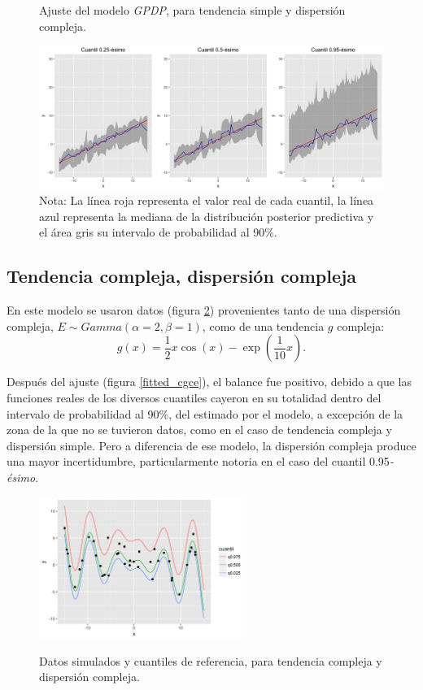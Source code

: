 \begin{figure}[H]
	\centering
	\caption{Ajuste del modelo \textit{GPDP}, para tendencia simple y dispersi\'on compleja.}
	\includegraphics[width=\textwidth]{Figures/Simulation/simple_g_complex_error/fitted_models.png}
	\captionsetup{singlelinecheck=off,font=footnotesize}
    \caption*{Nota: La l\'inea roja representa el valor real de cada cuantil, la l\'inea azul representa la mediana de la distribuci\'on posterior predictiva y el \'area gris su intervalo de probabilidad al 90\%.}
	\label{fitted_sgce}
\end{figure}

\subsection{Tendencia compleja, dispersi\'on compleja}

En este modelo se usaron datos (figura \ref{sample_cgce}) provenientes tanto de una dispersi\'on compleja, $E \sim \textit{Gamma}(\alpha = 2,\beta = 1)$, como de una tendencia $g$ compleja:
\begin{equation*}
    g(x) = \frac{1}{2} x \cos(x) - \exp\left(\frac{1}{10}x\right).
\end{equation*}

Despu\'es del ajuste (figura \ref{fitted_cgce}), el balance fue positivo, debido a que las funciones reales de los diversos cuantiles cayeron en su totalidad dentro del intervalo de probabilidad al 90\%, del estimado por el modelo, a excepci\'
on de la zona de la que no se tuvieron datos, como en el caso de tendencia compleja y dispersi\'on simple. Pero a diferencia de ese modelo, la dispersi\'on compleja produce una mayor incertidumbre, particularmente notoria en el caso del cuantil 0.95\textit{-\'esimo}.

\begin{figure}[H]
	\centering
	\caption{Datos simulados y cuantiles de referencia, para tendencia compleja y dispersi\'on compleja.}
	\includegraphics[width=0.60\textwidth]{Figures/Simulation/complex_g_complex_error/sample.png}
	\label{sample_cgce}
\end{figure}

